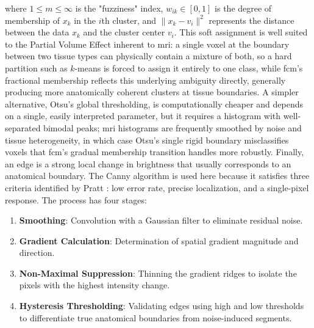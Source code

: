 where $ 1\le m \le \infty$ is the "fuzziness" index, $w_{ik}\in [0,1]$ is the degree of membership of $ x_k$ in the $i$th cluster, and $\|x_k - v_i\|^2$ represents the distance between the data $x_k$ and the cluster center $v_i$. This soft assignment is well suited to the Partial Volume Effect inherent to \gls{mri}: a single voxel at the boundary between two tissue types can physically contain a mixture of both, so a hard partition such as $k$-means is forced to assign it entirely to one class, while \gls{fcm}'s fractional membership reflects this underlying ambiguity directly, generally producing more anatomically coherent clusters at tissue boundaries. A simpler alternative, Otsu's global thresholding, is computationally cheaper and depends on a single, easily interpreted parameter, but it requires a histogram with well-separated bimodal peaks; \gls{mri} histograms are frequently smoothed by noise and tissue heterogeneity, in which case Otsu's single rigid boundary misclassifies voxels that \gls{fcm}'s gradual membership transition handles more robustly. Finally, an edge is a strong local change in brightness that usually corresponds to an anatomical boundary. The Canny algorithm is used here because it satisfies three criteria identified by Pratt \cite{pratt1979quantitative}: low error rate, precise localization, and a single-pixel response. The process has four stages:
\begin{enumerate}
    \item \textbf{Smoothing}: Convolution with a Gaussian filter to eliminate residual noise.
    \item \textbf{Gradient Calculation}: Determination of spatial gradient magnitude and direction.
    \item \textbf{Non-Maximal Suppression}: Thinning the gradient ridges to isolate the pixels with the highest intensity change.
    \item \textbf{Hysteresis Thresholding}: Validating edges using high and low thresholds to differentiate true anatomical boundaries from noise-induced segments.
\end{enumerate}